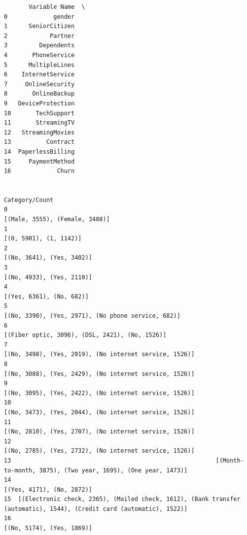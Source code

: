 \documentclass[8pt,onecolumn,aps,pra]{revtex4-1}
\begin{document}
    
    \begin{verbatim}
       Variable Name  \
0             gender   
1      SeniorCitizen   
2            Partner   
3         Dependents   
4       PhoneService   
5      MultipleLines   
6    InternetService   
7     OnlineSecurity   
8       OnlineBackup   
9   DeviceProtection   
10       TechSupport   
11       StreamingTV   
12   StreamingMovies   
13          Contract   
14  PaperlessBilling   
15     PaymentMethod   
16             Churn   

                                                                                                          Category/Count  
0                                                                                         [(Male, 3555), (Female, 3488)]  
1                                                                                                 [(0, 5901), (1, 1142)]  
2                                                                                              [(No, 3641), (Yes, 3402)]  
3                                                                                              [(No, 4933), (Yes, 2110)]  
4                                                                                               [(Yes, 6361), (No, 682)]  
5                                                                     [(No, 3390), (Yes, 2971), (No phone service, 682)]  
6                                                                         [(Fiber optic, 3096), (DSL, 2421), (No, 1526)]  
7                                                                 [(No, 3498), (Yes, 2019), (No internet service, 1526)]  
8                                                                 [(No, 3088), (Yes, 2429), (No internet service, 1526)]  
9                                                                 [(No, 3095), (Yes, 2422), (No internet service, 1526)]  
10                                                                [(No, 3473), (Yes, 2044), (No internet service, 1526)]  
11                                                                [(No, 2810), (Yes, 2707), (No internet service, 1526)]  
12                                                                [(No, 2785), (Yes, 2732), (No internet service, 1526)]  
13                                                          [(Month-to-month, 3875), (Two year, 1695), (One year, 1473)]  
14                                                                                             [(Yes, 4171), (No, 2872)]  
15  [(Electronic check, 2365), (Mailed check, 1612), (Bank transfer (automatic), 1544), (Credit card (automatic), 1522)]  
16                                                                                             [(No, 5174), (Yes, 1869)]  
    \end{verbatim}
\end{document}
